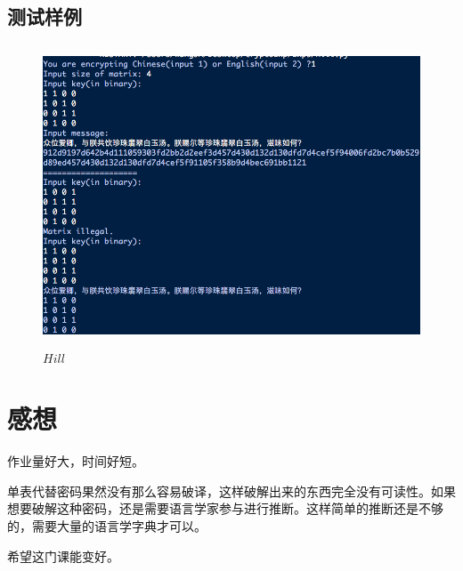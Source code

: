 \documentclass[11pt]{ctexart}
\begin{document}
\subsection{测试样例}
\begin{figure}[htbp]
\centering
\includegraphics[height=8.91cm,width=12.04cm]{hill.png}
\caption{$Hill$}
\label{img_hill}
\end{figure}

\section{感想}
作业量好大，时间好短。

单表代替密码果然没有那么容易破译，这样破解出来的东西完全没有可读性。如果想要破解这种密码，还是需要语言学家参与进行推断。这样简单的推断还是不够的，需要大量的语言学字典才可以。

希望这门课能变好。
\end{document}
